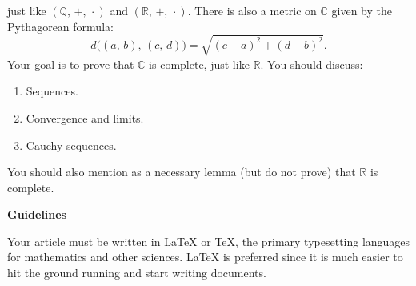 \documentclass{article}
\begin{document}
    just like $(\mathbb{Q},\,+,\,\cdot)$ and $(\mathbb{R},\,+,\,\cdot)$.
    There is also a metric on $\mathbb{C}$ given by the Pythagorean formula:
    \begin{equation}
        d\Big((a,\,b),\,(c,\,d)\Big)
        =
        \sqrt{(c-a)^{2}+(d-b)^{2}}.
    \end{equation}
    Your goal is to prove that $\mathbb{C}$ is complete, just like $\mathbb{R}$.
    You should discuss:
    \begin{enumerate}
        \item
            Sequences.
        \item
            Convergence and limits.
        \item
            Cauchy sequences.
    \end{enumerate}
    You should also mention as a necessary lemma (but do not prove)
    that $\mathbb{R}$ is complete.
    \par\hfill\par
    \textbf{\Large{Guidelines}}
    \par\hfill\par
    Your article must be written in \LaTeX{} or \TeX, the primary typesetting
    languages for mathematics and other sciences. \LaTeX{} is preferred since it
    is much easier to hit the ground running and start writing documents.
\end{document}
